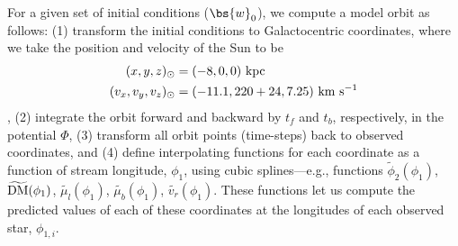 \documentclass[letterpaper,12pt,preprint]{aastex}
\newcommand{\DM}{{\rm DM}}
\begin{document}
For a given set of initial conditions ($\bs{w}_0$), we compute a model orbit as follows: (1) transform the initial conditions to Galactocentric coordinates, where we take the position and velocity of the Sun to be 
\begin{align}
	(x,y,z)_\odot &= (-8,0,0)~{\rm kpc}\\
	(v_x,v_y,v_z)_\odot &= (-11.1, 220+24, 7.25)~{\rm km}~{\rm s}^{-1}
\end{align}
\citep{8kpref??, schonrich10, bovy12}, (2) integrate the orbit forward and backward by $t_f$ and $t_b$, respectively, in the potential $\Phi$, (3) transform all orbit points (time-steps) back to observed coordinates, and (4) define interpolating functions for each coordinate as a function of stream longitude, $\phi_1$, using cubic splines---e.g., functions $\widetilde{\phi}_{2}(\phi_1)$, $\widetilde{\DM}(\phi_1)$, $\widetilde{\mu_l}(\phi_1)$, $\widetilde{\mu_b}(\phi_1)$, $\widetilde{v_r}(\phi_1)$. These functions let us compute the predicted values of each of these coordinates at the longitudes of each observed star, $\phi_{1,i}$.
\end{document}
